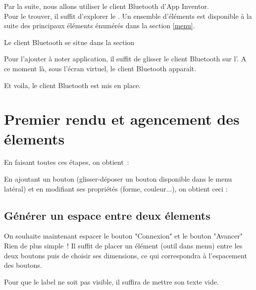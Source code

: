 Par la suite, nous allons utiliser le client Bluetooth d'App Inventor. \\
Pour le trouver, il suffit d'explorer le . Un ensemble d'éléments est disponible à la suite des principaux éléments énumérés dans la section \ref{menu}.


Le client Bluetooth se situe dans la section 

Pour l'ajouter à noter application, il suffit de glisser le client Bluetooth sur l'.
A ce moment là, sous l'écran virtuel, le client Bluetooth apparaît.


Et voila, le client Bluetooth est mis en place.

\section{Premier rendu et agencement des élements}

En faisant toutes ces étapes, on obtient : 


En ajoutant un bouton (glisser-déposer un bouton disponible dans le menu latéral) et en modifiant ses propriétés (forme, couleur...), on obtient ceci : 


\subsection{Générer un espace entre deux élements}

On souhaite maintenant espacer le bouton "Connexion" et le bouton "Avancer" \\

Rien de plus simple ! Il suffit de placer un élément 
(outil dans menu) entre les deux boutons puis de
choisir ses dimensions, ce qui correspondra à l'espacement des boutons. \\

Pour que le label ne soit pas visible, il suffira de mettre son texte vide.

